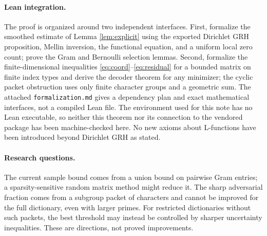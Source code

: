 \documentclass[11pt]{article}
\theoremstyle{remark}\newtheorem{remark}[theorem]{Remark}
\begin{document}
\paragraph{Lean integration.}
The proof is organized around two independent interfaces. First, formalize the smoothed estimate of Lemma \ref{lem:explicit} using the exported Dirichlet GRH proposition, Mellin inversion, the functional equation, and a uniform local zero count; prove the Gram and Bernoulli selection lemmas. Second, formalize the finite-dimensional inequalities \eqref{eq:coord}--\eqref{eq:residual} for a bounded matrix on finite index types and derive the decoder theorem for any minimizer; the cyclic packet obstruction uses only finite character groups and a geometric sum. The attached \texttt{formalization.md} gives a dependency plan and exact mathematical interfaces, not a compiled Lean file. The environment used for this note has no Lean executable, so neither this theorem nor its connection to the vendored package has been machine-checked here. No new axioms about L-functions have been introduced beyond Dirichlet GRH as stated.

\paragraph{Research questions.}
The current sample bound comes from a union bound on pairwise Gram entries; a sparsity-sensitive random matrix method might reduce it. The sharp adversarial fraction comes from a subgroup packet of characters and cannot be improved for the full dictionary, even with larger primes. For restricted dictionaries without such packets, the best threshold may instead be controlled by sharper uncertainty inequalities. These are directions, not proved improvements.
\end{document}
